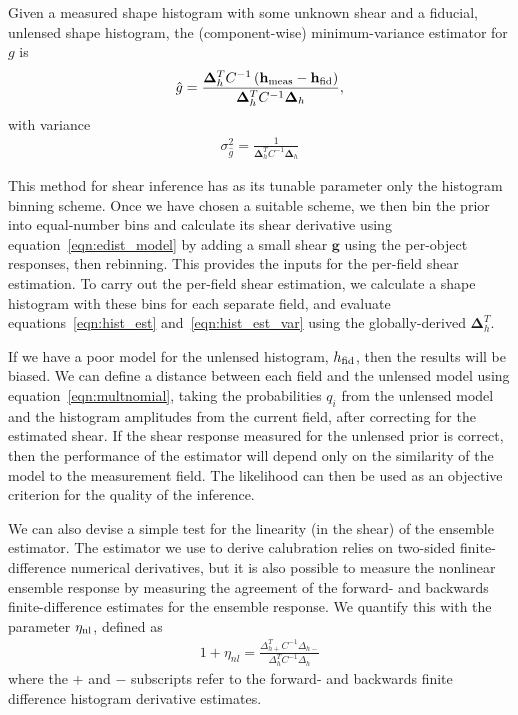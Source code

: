 \documentclass[iop]{emulateapj}
\begin{document}
Given a measured shape histogram with some unknown shear and a
fiducial, unlensed shape histogram, the (component-wise)
minimum-variance estimator for $g$ is
\begin{align}
\hat{g} = \frac{\mathbf{\Delta}_h^T C^{-1}\left( \mathbf{h}_{\rm meas} - \mathbf{h}_{\rm fid}\right)} {\mathbf{\Delta}_h^TC^{-1}\mathbf{\Delta}_h},
\label{eqn:hist_est}
\end{align}
with variance 
\begin{align}
\sigma^2_{\hat{g}} = \frac{1}{\mathbf{\Delta}_h^TC^{-1}\mathbf{\Delta}_h}
\label{eqn:hist_est_var}
\end{align}

This method for shear inference has as its tunable parameter only the
histogram binning scheme. Once we have chosen a suitable scheme, we
then bin the prior into equal-number bins and calculate its shear
derivative using equation~\ref{eqn:edist_model} by adding a small
shear $\mathbf{g}$ using the per-object responses, then
rebinning. This provides the inputs for the per-field shear
estimation.  To carry out the per-field shear estimation, we calculate
a shape histogram with these bins for each separate field, and
evaluate equations~\ref{eqn:hist_est} and~\ref{eqn:hist_est_var} using
the globally-derived $\mathbf{\Delta}_h^T$.

If we have a poor model for the unlensed histogram, $h_{\rm fid}$,
then the results will be biased. We can define a distance between each
field and the unlensed model using equation~\ref{eqn:multnomial},
taking the probabilities $q_i$ from the unlensed model and the
histogram amplitudes from the current field, after correcting for the
estimated shear. If the shear response measured for the unlensed prior
is correct, then the performance of the estimator will depend only on
the similarity of the model to the measurement field. The likelihood
can then be used as an objective criterion for the quality of the
inference.

We can also devise a simple test for the linearity (in the shear) of
the ensemble estimator. The estimator we use to derive calubration
relies on two-sided finite-difference numerical derivatives, but it is
also possible to measure the nonlinear ensemble response by measuring
the agreement of the forward- and backwards finite-difference
estimates for the ensemble response. We quantify this with the parameter $\eta_{\rm
  nl}$, defined as 
\begin{align}
1+\eta_{nl} = \frac{\Delta_{h+}^T C^{-1} \Delta_{h-}}{\Delta_{h}^TC^{-1}\Delta_{h}}
\end{align}
where the $+$ and $-$ subscripts refer to the forward- and backwards
finite difference histogram derivative estimates.
\end{document}
